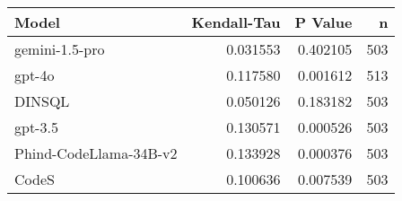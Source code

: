 \begin{tabular}{lrrr}
\toprule
Model & Kendall-Tau & P Value & n \\
\midrule
gemini-1.5-pro & 0.031553 & 0.402105 & 503 \\
gpt-4o & 0.117580 & 0.001612 & 513 \\
DINSQL & 0.050126 & 0.183182 & 503 \\
gpt-3.5 & 0.130571 & 0.000526 & 503 \\
Phind-CodeLlama-34B-v2 & 0.133928 & 0.000376 & 503 \\
CodeS & 0.100636 & 0.007539 & 503 \\
\bottomrule
\end{tabular}
